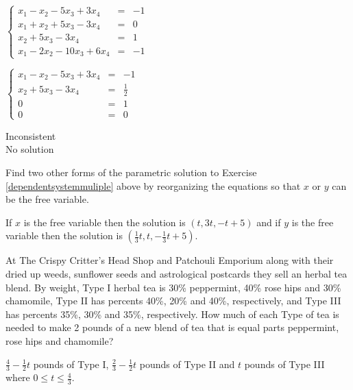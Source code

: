 \documentclass{ximera}
\begin{document}
\begin{question}
\begin{problem}\label{trianglast}
$\left\{ \begin{array}{rcr} x_1 - x_2 - 5x_3 +  3x_4 & = & -1 \\ 
x_1 + x_2 + 5x_3 - 3x_4 & = & 0  \\  
x_2 + 5x_3 - 3x_4 & = & 1 \\
x_1 -  2x_2 - 10x_3 + 6x_4 & = & -1  \end{array} \right.$

\begin{solution}
$\left\{ \begin{array}{rcr} x_1 - x_2 - 5x_3 +  3x_4 & = & -1 \\ 
x_2 + 5x_3 - 3x_4 & = & \frac{1}{2}  \\  
0 & = & 1 \\
0 & = & 0 \end{array} \right.$

Inconsistent\\
No solution
\end{solution}
\end{problem}

\end{question}

\begin{problem}
Find two other forms of the parametric solution to Exercise \ref{dependentsystemmuliple} above by reorganizing the equations so that $x$ or $y$ can be the free variable.

\begin{solution}
If $x$ is the free variable then the solution is $(t, 3t, -t + 5)$ and if $y$ is the free variable then the solution is $\left(\frac{1}{3}t, t, -\frac{1}{3}t + 5\right)$.
\end{solution}
\end{problem}

\begin{problem}\label{herbalteablend}
At The Crispy Critter's Head Shop and Patchouli Emporium along with their dried up weeds, sunflower seeds and astrological postcards they sell an herbal tea blend.  By weight, Type I herbal tea is 30\% peppermint, 40\% rose hips and 30\% chamomile, Type II has percents 40\%, 20\% and 40\%, respectively, and Type III has percents 35\%, 30\% and 35\%, respectively.  How much of each Type of tea is needed to make 2 pounds of a new blend of tea that is equal parts peppermint, rose hips and chamomile? 

\begin{solution}
$\frac{4}{3}- \frac{1}{2}t$ pounds of Type I, $\frac{2}{3} - \frac{1}{2}t$ pounds of Type II and $t$ pounds of Type III where $0 \leq t \leq \frac{4}{3}$.
\end{solution}
\end{problem}
\end{document}
